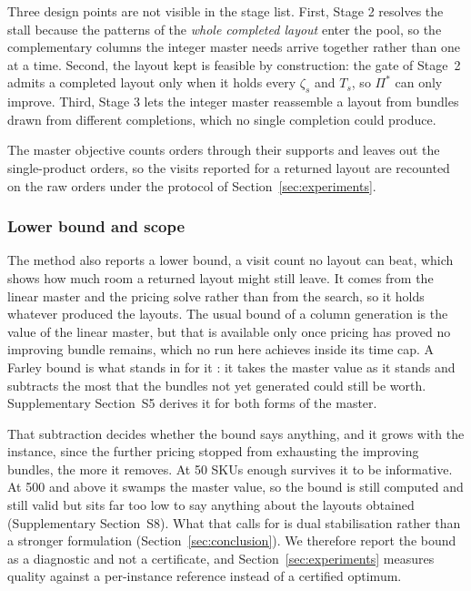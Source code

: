 \documentclass[]{interact}
\begin{document}
Three design points are not visible in the stage list. First, Stage 2 resolves the stall because the patterns of the \emph{whole completed layout} enter the pool, so the complementary columns the integer master needs arrive together rather than one at a time. Second, the layout kept is feasible by construction: the gate of Stage~2 admits a completed layout only when it holds every $\zeta_s$ and $T_s$, so $\Pi^{\ast}$ can only improve. Third, Stage 3 lets the integer master reassemble a layout from bundles drawn from different completions, which no single completion could produce.

The master objective counts orders through their supports and leaves out the single-product orders, so the visits reported for a returned layout are recounted on the raw orders under the protocol of Section~\ref{sec:experiments}.

\subsubsection{Lower bound and scope}\label{sec:cgbound}
The method also reports a lower bound, a visit count no layout can beat, which shows how much room a returned layout might still leave. It comes from the linear master and the pricing solve rather than from the search, so it holds whatever produced the layouts. The usual bound of a column generation is the value of the linear master, but that is available only once pricing has proved no improving bundle remains, which no run here achieves inside its time cap. A Farley bound is what stands in for it \citep{farley1990note}: it takes the master value as it stands and subtracts the most that the bundles not yet generated could still be worth. Supplementary Section~S5 derives it for both forms of the master.

That subtraction decides whether the bound says anything, and it grows with the instance, since the further pricing stopped from exhausting the improving bundles, the more it removes. At 50 SKUs enough survives it to be informative. At 500 and above it swamps the master value, so the bound is still computed and still valid but sits far too low to say anything about the layouts obtained (Supplementary Section~S8). What that calls for is dual stabilisation rather than a stronger formulation (Section~\ref{sec:conclusion}). We therefore report the bound as a diagnostic and not a certificate, and Section~\ref{sec:experiments} measures quality against a per-instance reference instead of a certified optimum.
\end{document}
